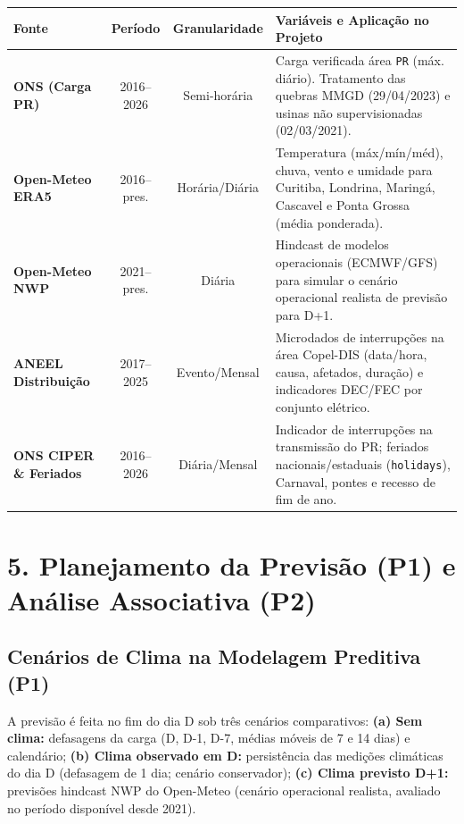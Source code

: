 \documentclass[
  a4paper,
  10pt,
  oneside,
  english,
  brazilian,
]{memoir}
\begin{document}
\begin{center}
\small
\begin{tabularx}{\textwidth}{|l|c|c|X|}
\hline
\textbf{Fonte} & \textbf{Período} & \textbf{Granularidade} & \textbf{Variáveis e Aplicação no Projeto} \\
\hline
\textbf{ONS (Carga PR)} & 2016--2026 & Semi-horária & Carga verificada área \texttt{PR} (máx. diário). Tratamento das quebras MMGD (29/04/2023) e usinas não supervisionadas (02/03/2021). \\
\hline
\textbf{Open-Meteo ERA5} & 2016--pres. & Horária/Diária & Temperatura (máx/mín/méd), chuva, vento e umidade para Curitiba, Londrina, Maringá, Cascavel e Ponta Grossa (média ponderada). \\
\hline
\textbf{Open-Meteo NWP} & 2021--pres. & Diária & Hindcast de modelos operacionais (ECMWF/GFS) para simular o cenário operacional realista de previsão para D+1. \\
\hline
\textbf{ANEEL Distribuição} & 2017--2025 & Evento/Mensal & Microdados de interrupções na área Copel-DIS (data/hora, causa, afetados, duração) e indicadores DEC/FEC por conjunto elétrico. \\
\hline
\textbf{ONS CIPER \& Feriados} & 2016--2026 & Diária/Mensal & Indicador de interrupções na transmissão do PR; feriados nacionais/estaduais (\texttt{holidays}), Carnaval, pontes e recesso de fim de ano. \\
\hline
\end{tabularx}
\end{center}

\section*{5. Planejamento da Previsão (P1) e Análise Associativa (P2)}

\subsection*{Cenários de Clima na Modelagem Preditiva (P1)}
A previsão é feita no fim do dia D sob três cenários comparativos: \textbf{(a) Sem clima:} defasagens da carga (D, D-1, D-7, médias móveis de 7 e 14 dias) e calendário; \textbf{(b) Clima observado em D:} persistência das medições climáticas do dia D (defasagem de 1 dia; cenário conservador); \textbf{(c) Clima previsto D+1:} previsões hindcast NWP do Open-Meteo (cenário operacional realista, avaliado no período disponível desde 2021).
\end{document}
